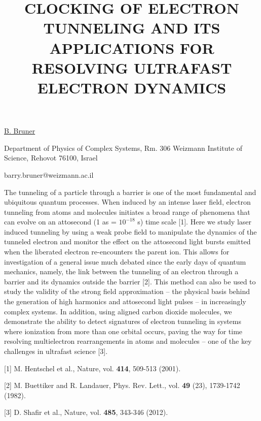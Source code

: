 \title{CLOCKING OF ELECTRON TUNNELING AND ITS APPLICATIONS FOR RESOLVING ULTRAFAST ELECTRON DYNAMICS}

\underline{B. Bruner} 

{\normalsize{\vspace{-4mm}
Department of Physics of Complex Systems, Rm. 306 Weizmann Institute
of Science, Rehovot 76100, Israel

\email barry.bruner@weizmann.ac.il}}

The tunneling of a particle through a barrier is one of the most fundamental and
ubiquitous quantum processes.  When induced by an intense laser field, electron tunneling from
atoms and molecules initiates a broad range of phenomena that can evolve on an attosecond (1 as =
$10^{-18}$ s) time scale [1].  Here we study laser induced tunneling by using a weak probe field to
manipulate the dynamics of the tunneled electron and monitor the effect on the attosecond light
bursts emitted when the liberated electron re-encounters the parent ion.  This allows for
investigation of a general issue much debated since the early days of quantum mechanics, namely, the
link between the tunneling of an electron through a barrier and its dynamics outside the barrier
[2].  This method can also be used to study the validity of the strong field approximation -- the
physical basis behind the generation of high harmonics and attosecond light pulses -- in
increasingly complex systems.  In addition, using aligned carbon dioxide molecules, we demonstrate
the ability to detect signatures of electron tunneling in systems where ionization from more than
one orbital occurs, paving the way for time resolving multielectron rearrangements in atoms and
molecules -- one of the key challenges in ultrafast science [3].

{\normalsize
[1] M. Hentschel et al., Nature, vol. \textbf{414}, 509-513 (2001).
\vsp

[2] M. Buettiker and R. Landauer, Phys. Rev. Lett., vol. \textbf{49} (23), 1739-1742 (1982).
\vsp

[3] D. Shafir et al., Nature, vol. \textbf{485}, 343-346 (2012).
}

\vspace{\baselineskip} 